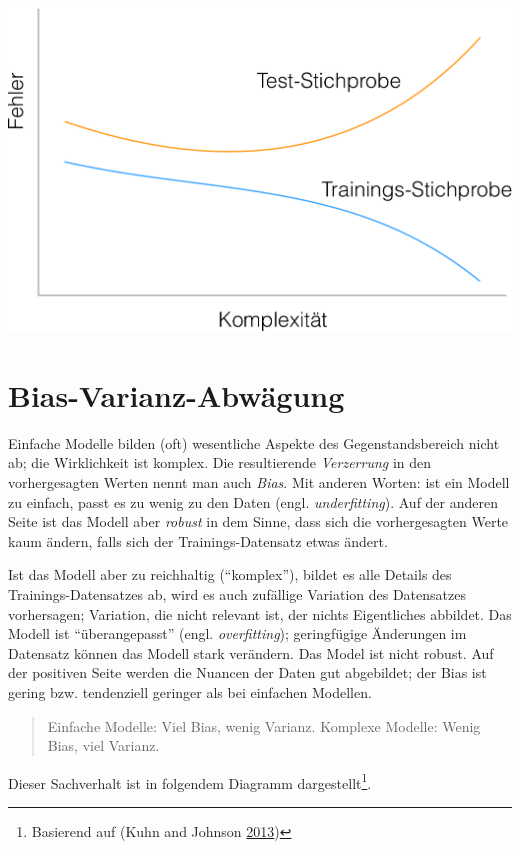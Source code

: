 \documentclass[12pt,]{book}
\let\rmarkdownfootnote\footnote%
\def\footnote{\protect\rmarkdownfootnote}
\begin{document}
\begin{center}\includegraphics[width=0.7\linewidth]{images/overfitting} \end{center}

\section{Bias-Varianz-Abwägung}\label{bias-varianz-abwagung}

Einfache Modelle bilden (oft) wesentliche Aspekte des Gegenstandsbereich
nicht ab; die Wirklichkeit ist komplex. Die resultierende
\emph{Verzerrung} in den vorhergesagten Werten nennt man auch
\emph{Bias}. Mit anderen Worten: ist ein Modell zu einfach,
passt es zu wenig zu den Daten (engl. \emph{underfitting}). Auf der
anderen Seite ist das Modell aber \emph{robust} in dem
Sinne, dass sich die vorhergesagten Werte kaum ändern, falls sich der
Trainings-Datensatz etwas ändert.

Ist das Modell aber zu reichhaltig (``komplex''), bildet es alle Details
des Trainings-Datensatzes ab, wird es auch zufällige Variation des
Datensatzes vorhersagen; Variation, die nicht relevant ist, der nichts
Eigentliches abbildet. Das Modell ist ``überangepasst'' (engl.
\emph{overfitting}); geringfügige Änderungen im Datensatz können das
Modell stark verändern. Das Model ist nicht robust. Auf der positiven
Seite werden die Nuancen der Daten gut abgebildet; der Bias ist gering
bzw. tendenziell geringer als bei einfachen Modellen.

\begin{quote}
Einfache Modelle: Viel Bias, wenig Varianz. Komplexe Modelle: Wenig
Bias, viel Varianz.
\end{quote}

Dieser Sachverhalt ist in folgendem Diagramm dargestellt\footnote{Basierend
  auf (Kuhn and Johnson \protect\hyperlink{ref-kuhn2013applied}{2013})}.
\end{document}
